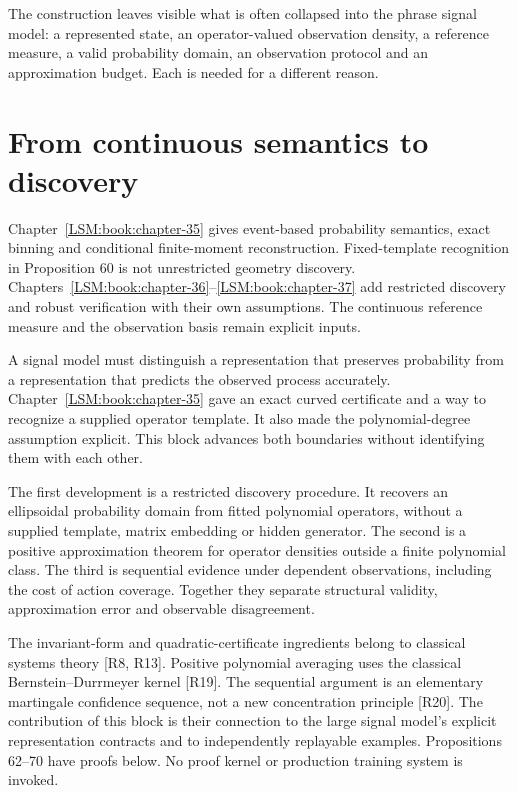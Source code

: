 The construction leaves visible what is often collapsed into the phrase
signal model: a represented state, an operator-valued observation
density, a reference measure, a valid probability domain, an observation
protocol and an approximation budget. Each is needed for a different
reason.

\section{From continuous semantics to discovery}\label{LSM:from-continuous-semantics-to-discovery}

Chapter~\ref{LSM:book:chapter-35} gives event-based probability semantics, exact binning and
conditional finite-moment reconstruction. Fixed-template recognition in
Proposition 60 is not unrestricted geometry discovery. Chapters~\ref{LSM:book:chapter-36}--\ref{LSM:book:chapter-37} add
restricted discovery and robust verification with their own assumptions.
The continuous reference measure and the observation basis remain
explicit inputs.


\label{LSM:part-vi.-certificate-discovery-approximation-and-sequential-evidence}

A signal model must distinguish a representation that preserves
probability from a representation that predicts the observed process
accurately. Chapter~\ref{LSM:book:chapter-35} gave an exact curved certificate and a way to
recognize a supplied operator template. It also made the
polynomial-degree assumption explicit. This block advances both
boundaries without identifying them with each other.

The first development is a restricted discovery procedure. It recovers
an ellipsoidal probability domain from fitted polynomial operators,
without a supplied template, matrix embedding or hidden generator. The
second is a positive approximation theorem for operator densities
outside a finite polynomial class. The third is sequential evidence
under dependent observations, including the cost of action coverage.
Together they separate structural validity, approximation error and
observable disagreement.

The invariant-form and quadratic-certificate ingredients belong to
classical systems theory {[}R8, R13{]}. Positive polynomial averaging
uses the classical Bernstein--Durrmeyer kernel {[}R19{]}. The sequential
argument is an elementary martingale confidence sequence, not a new
concentration principle {[}R20{]}. The contribution of this block is
their connection to the large signal model's explicit representation
contracts and to independently replayable examples. Propositions 62--70
have proofs below. No proof kernel or production training system is
invoked.


